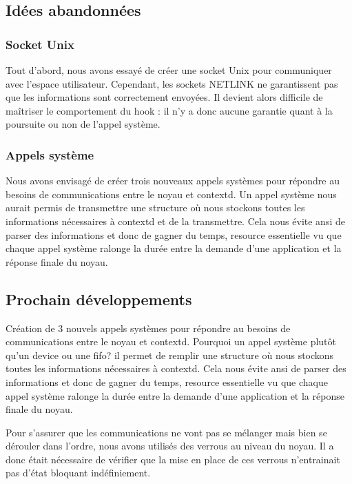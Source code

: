 \documentclass[pdftex,a4paper,titlepage,11pt,openright]{article}
\begin{document}
\newpage

\subsection{Idées abandonnées}

\subsubsection{Socket Unix}

Tout d'abord, nous avons essayé de créer une socket Unix pour communiquer avec l'espace utilisateur. Cependant, les sockets NETLINK ne garantissent pas que les informations sont correctement envoyées. Il devient alors difficile de maîtriser le comportement du hook : il n'y a donc aucune garantie quant à la poursuite ou non de l'appel système.

\subsubsection{Appels système}

Nous avons envisagé de créer trois nouveaux appels systèmes pour répondre au besoins de communications entre le noyau et contextd. Un appel système nous aurait permis de transmettre une structure où nous stockons toutes les informations nécessaires à contextd et de la transmettre. Cela nous évite ansi de parser des informations et donc de gagner du temps, resource essentielle vu que chaque appel système ralonge la durée entre la demande d'une application et la réponse finale du noyau.

\subsection{Prochain développements}

Création de 3 nouvels appels systèmes pour répondre au besoins de communications entre le noyau et contextd. Pourquoi un appel système plutôt qu'un device ou une fifo? il permet de remplir une structure où nous stockons toutes les informations nécessaires à contextd. Cela nous évite ansi de parser des informations et donc de gagner du temps, resource essentielle vu que chaque appel système ralonge la durée entre la demande d'une application et la réponse finale du noyau.


Pour s'assurer que les communications ne vont pas se mélanger mais bien se dérouler dans l'ordre, nous avons utilisés des verrous au niveau du noyau. Il a donc était nécessaire de vérifier que la mise en place de ces verrous n'entrainait pas d'état bloquant indéfiniement.
\end{document}
